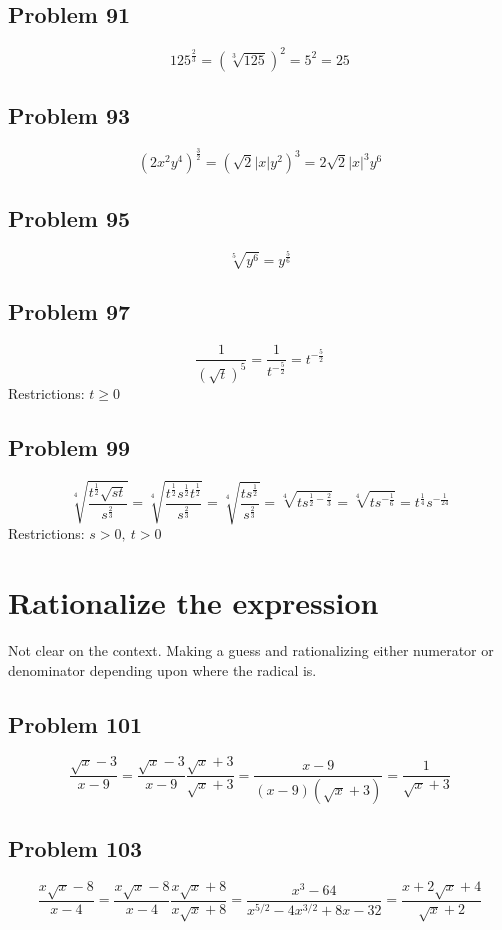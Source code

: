 \documentclass[11pt, oneside]{article}   	%
\begin{document}
\subsection{Problem 91}
$$125^{\frac{2}{3}} = \left(\sqrt[3]{125}\right)^{2} = 5^{2} = 25$$

\subsection{Problem 93}
$$\left( 2x^{2}y^{4} \right)^{\frac{3}{2}} 
=\left( \sqrt{2} \left| x \right| y^{2} \right)^{3}
= 2 \sqrt{2} \left| x \right|^{3} y^{6}$$

\subsection{Problem 95}
$$\sqrt[5]{y^{6}} = y^{\frac{5}{6}}$$

\subsection{Problem 97}
$$\frac{1} {\left( \sqrt{t} \right)^{5}} = \frac{1}{t^{-\frac{5}{2}}} = t^{-\frac{5}{2}}$$
Restrictions: $t\ge0$

\subsection{Problem 99}
$$
 \sqrt[4]{ \frac{t^{\frac{1}{2}}\sqrt{st}} {s^{\frac{2}{3}}} }
=\sqrt[4]{ \frac{t^{\frac{1}{2}}s^{\frac{1}{2}}t^{\frac{1}{2}}} {s^{\frac{2}{3}}} }
=\sqrt[4]{ \frac{t s^{\frac{1}{2}}} {s^{\frac{2}{3}}} } 
=\sqrt[4]{ t s^{\frac{1}{2}-\frac{2}{3}} } 
=\sqrt[4]{ t s^{-\frac{1}{6}} }
= t^{\frac{1}{4}}s^{-\frac{1}{24}}
$$
Restrictions: $s>0, \ t>0$

\section{Rationalize the expression}
Not clear on the context. Making a guess and rationalizing either numerator or denominator depending upon where the radical is.

\subsection{Problem 101}
$$\frac{\sqrt{x} - 3} {x - 9} 
=\frac{\sqrt{x} - 3} {x - 9} \frac{\sqrt{x} + 3} {\sqrt{x} + 3}
=\frac{x-9} {(x-9) \left(\sqrt{x} + 3\right)}
=\frac{1} {\sqrt{x} + 3}$$

\subsection{Problem 103}
$$\frac{x\sqrt{x} - 8} {x - 4} 
= \frac{x\sqrt{x} - 8} {x - 4} \frac{x\sqrt{x} + 8} {x\sqrt{x} + 8}
= \frac{x^{3}-64} {x^{5/2}-4 x^{3/2}+8 x-32}
=\frac{x+2 \sqrt{x}+4}{\sqrt{x}+2}
$$
\end{document}
